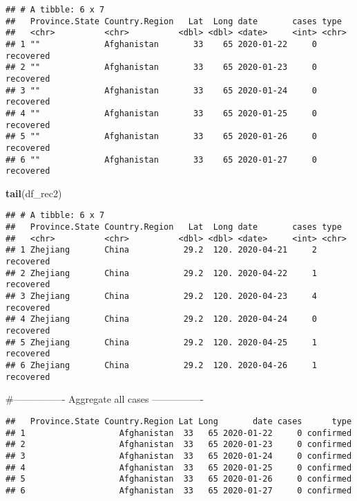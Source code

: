 \documentclass[
]{article}
\newenvironment{Shaded}{\begin{snugshade}}{\end{snugshade}}
\newcommand{\KeywordTok}[1]{\textcolor[rgb]{0.13,0.29,0.53}{\textbf{#1}}}
\newcommand{\NormalTok}[1]{#1}
\newcommand{\OperatorTok}[1]{\textcolor[rgb]{0.81,0.36,0.00}{\textbf{#1}}}
\newcommand{\StringTok}[1]{\textcolor[rgb]{0.31,0.60,0.02}{#1}}
\begin{document}
\begin{verbatim}
## # A tibble: 6 x 7
##   Province.State Country.Region   Lat  Long date       cases type     
##   <chr>          <chr>          <dbl> <dbl> <date>     <int> <chr>    
## 1 ""             Afghanistan       33    65 2020-01-22     0 recovered
## 2 ""             Afghanistan       33    65 2020-01-23     0 recovered
## 3 ""             Afghanistan       33    65 2020-01-24     0 recovered
## 4 ""             Afghanistan       33    65 2020-01-25     0 recovered
## 5 ""             Afghanistan       33    65 2020-01-26     0 recovered
## 6 ""             Afghanistan       33    65 2020-01-27     0 recovered
\end{verbatim}

\begin{Shaded}
\begin{Highlighting}[]
\KeywordTok{tail}\NormalTok{(df_rec2)}
\end{Highlighting}
\end{Shaded}

\begin{verbatim}
## # A tibble: 6 x 7
##   Province.State Country.Region   Lat  Long date       cases type     
##   <chr>          <chr>          <dbl> <dbl> <date>     <int> <chr>    
## 1 Zhejiang       China           29.2  120. 2020-04-21     2 recovered
## 2 Zhejiang       China           29.2  120. 2020-04-22     1 recovered
## 3 Zhejiang       China           29.2  120. 2020-04-23     4 recovered
## 4 Zhejiang       China           29.2  120. 2020-04-24     0 recovered
## 5 Zhejiang       China           29.2  120. 2020-04-25     1 recovered
## 6 Zhejiang       China           29.2  120. 2020-04-26     1 recovered
\end{verbatim}

\#---------------- Aggregate all cases ----------------

\begin{Shaded}
\end{Shaded}

\begin{verbatim}
##   Province.State Country.Region Lat Long       date cases      type
## 1                   Afghanistan  33   65 2020-01-22     0 confirmed
## 2                   Afghanistan  33   65 2020-01-23     0 confirmed
## 3                   Afghanistan  33   65 2020-01-24     0 confirmed
## 4                   Afghanistan  33   65 2020-01-25     0 confirmed
## 5                   Afghanistan  33   65 2020-01-26     0 confirmed
## 6                   Afghanistan  33   65 2020-01-27     0 confirmed
\end{verbatim}
\end{document}

